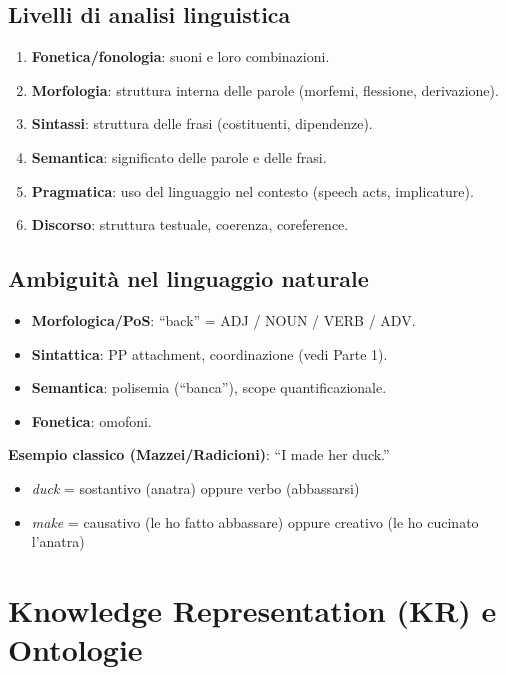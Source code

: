 \documentclass[12pt,a4paper]{article}
\begin{document}
\subsection{Livelli di analisi linguistica}

\begin{enumerate}[leftmargin=1.5em, label=\arabic*.]
  \item \textbf{Fonetica/fonologia}: suoni e loro combinazioni.
  \item \textbf{Morfologia}: struttura interna delle parole (morfemi, flessione, derivazione).
  \item \textbf{Sintassi}: struttura delle frasi (costituenti, dipendenze).
  \item \textbf{Semantica}: significato delle parole e delle frasi.
  \item \textbf{Pragmatica}: uso del linguaggio nel contesto (speech acts, implicature).
  \item \textbf{Discorso}: struttura testuale, coerenza, coreference.
\end{enumerate}

\subsection{Ambiguità nel linguaggio naturale}

\begin{itemize}[leftmargin=1.5em]
  \item \textbf{Morfologica/PoS}: ``back'' = ADJ / NOUN / VERB / ADV.
  \item \textbf{Sintattica}: PP attachment, coordinazione (vedi Parte 1).
  \item \textbf{Semantica}: polisemia (``banca''), scope quantificazionale.
  \item \textbf{Fonetica}: omofoni.
\end{itemize}

\textbf{Esempio classico (Mazzei/Radicioni)}: ``I made her duck.''
\begin{itemize}[leftmargin=1.5em, nosep]
  \item \emph{duck} = sostantivo (anatra) oppure verbo (abbassarsi)
  \item \emph{make} = causativo (le ho fatto abbassare) oppure creativo (le ho cucinato l'anatra)
\end{itemize}

\section{Knowledge Representation (KR) e Ontologie}
\end{document}
